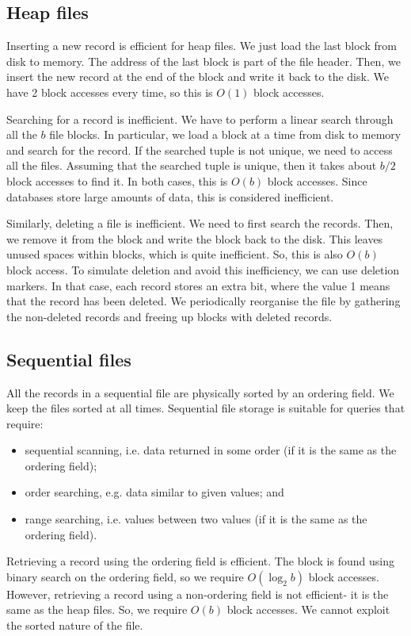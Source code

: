 \documentclass[a4paper, openany]{memoir}
\begin{document}
\subsection{Heap files}
Inserting a new record is efficient for heap files. We just load the last block from disk to memory. The address of the last block is part of the file header. Then, we insert the new record at the end of the block and write it back to the disk. We have 2 block accesses every time, so this is $O(1)$ block accesses.

Searching for a record is inefficient. We have to perform a linear search through all the $b$ file blocks. In particular, we load a block at a time from disk to memory and search for the record. If the searched tuple is not unique, we need to access all the files. Assuming that the searched tuple is unique, then it takes about $b/2$ block accesses to find it. In both cases, this is $O(b)$ block accesses. Since databases store large amounts of data, this is considered inefficient.

Similarly, deleting a file is inefficient. We need to first search the records. Then, we remove it from the block and write the block back to the disk. This leaves unused spaces within blocks, which is quite inefficient. So, this is also $O(b)$ block access. To simulate deletion and avoid this inefficiency, we can use deletion markers. In that case, each record stores an extra bit, where the value 1 means that the record has been deleted. We periodically reorganise the file by gathering the non-deleted records and freeing up blocks with deleted records.

\subsection{Sequential files}
All the records in a sequential file are physically sorted by an ordering field. We keep the files sorted at all times. Sequential file storage is suitable for queries that require:
\begin{itemize}
    \item sequential scanning, i.e. data returned in some order (if it is the same as the ordering field);
    \item order searching, e.g. data similar to given values; and
    \item range searching, i.e. values between two values (if it is the same as the ordering field).
\end{itemize}

Retrieving a record using the ordering field is efficient. The block is found using binary search on the ordering field, so we require $O(\log_2 b)$ block accesses. However, retrieving a record using a non-ordering field is not efficient- it is the same as the heap files. So, we require $O(b)$ block accesses. We cannot exploit the sorted nature of the file.
\end{document}
